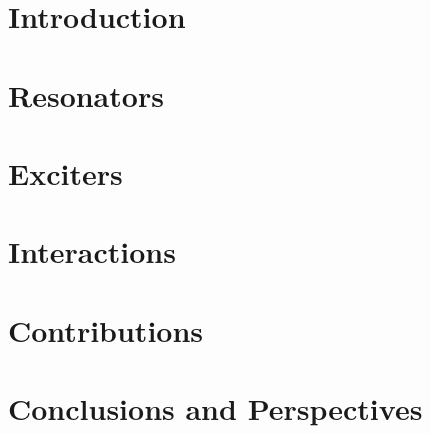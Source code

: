 \cleardoublepage
{}
\pagestyle{fancy} %
\tableofcontents

\listoftodos
\cleardoublepage

\def\makeAlph[#1]{\symbol{\numexpr96+#1}}

\mainmatter

\part{Introduction}\label{part:introduction}


\part{Resonators}\label{part:resonators}


\part{Exciters}\label{part:exciters}


\part{Interactions}\label{part:interactions}


% 

\part{Contributions}\label{part:contributions}



\part{Conclusions and Perspectives}\label{part:conclusion}



